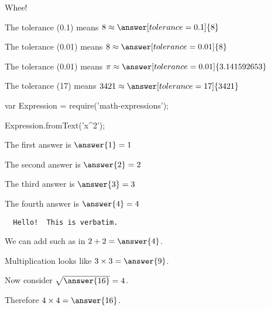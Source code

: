 \documentclass{ximera}
\begin{document}
Whee!

\begin{problem}
  The tolerance (0.1) means $8 \approx \answer[tolerance=0.1]{8}$
\end{problem}

\begin{problem}
  The tolerance (0.01) means $8 \approx \answer[tolerance=0.01]{8}$
\end{problem}

\begin{problem}
  The tolerance (0.01) means $\pi \approx \answer[tolerance=0.01]{3.141592653}$
\end{problem}

\begin{problem}
  The tolerance (17) means $3421 \approx \answer[tolerance=17]{3421}$
\end{problem}

\begin{code}
  var Expression = require('math-expressions');

  Expression.fromText('x^2');
\end{code}

\begin{shuffle}
  \begin{problem}
    The first answer is $\answer{1} = 1$
  \end{problem}

  \begin{problem}
    The second answer is $\answer{2} = 2$
  \end{problem}

  \begin{problem}
    The third answer is $\answer{3} = 3$
  \end{problem}

  \begin{problem}
    The fourth answer is $\answer{4} = 4$

  \end{problem}
\end{shuffle}

\begin{verbatim}
  Hello!  This is verbatim.
\end{verbatim}

\begin{problem}
  We can add such as in $2 + 2 = \answer{4}$.
  
  \begin{problem}
    Multiplication looks like $3 \times 3 = \answer{9}$.
    
    \begin{problem}
      Now consider $\sqrt{\answer{16}} = 4$.
      
      \begin{problem}
        Therefore $4 \times 4 = \answer{16}$.
      \end{problem}
    \end{problem}
  \end{problem}
\end{problem}
\end{document}
